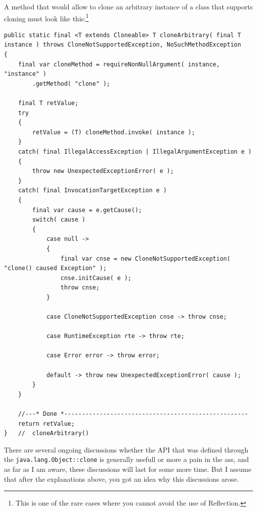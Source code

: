 A method that would allow to clone an arbitrary instance of a class that supports cloning must look like this:\footnote{This is one of the rare cases where you cannot avoid the use of Reflection.}
\begin{lstlisting}
public static final <T extends Cloneable> T cloneArbitrary( final T instance ) throws CloneNotSupportedException, NoSuchMethodException
{
    final var cloneMethod = requireNonNullArgument( instance, "instance" )
        .getMethod( "clone" );
        
    final T retValue;
    try
    {
        retValue = (T) cloneMethod.invoke( instance );
    }    
    catch( final IllegalAccessException | IllegalArgumentException e )
    {
        throw new UnexpectedExceptionError( e );
    }
    catch( final InvocationTargetException e )
    {
        final var cause = e.getCause();
        switch( cause )
        {
            case null -> 
            {
                final var cnse = new CloneNotSupportedException( "clone() caused Exception" );
                cnse.initCause( e );
                throw cnse;
            }
            
            case CloneNotSupportedException cnse -> throw cnse;
            
            case RuntimeException rte -> throw rte;
            
            case Error error -> throw error;

            default -> throw new UnexpectedExceptionError( cause );
        }
    }

    //---* Done *----------------------------------------------------
    return retValue;
}   //  cloneArbitrary()
\end{lstlisting}

There are several ongoing discussions whether the API that was defined through the \lstinline|java.lang.Object::clone| is generally usefull or more a pain in the ass, and as far as I am aware, these discussions will last for some more time. But I assume that after the explanations above, you got an idea why this discussions arose.

